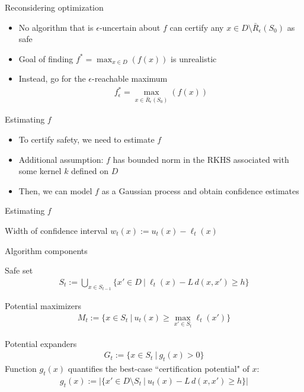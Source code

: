 \documentclass[10pt,mathserif]{beamer}
\newlength\figureheight
\newlength\figurewidth
\newcommand{\Rbeps}{\bar{R}_{\epsilon}}
\newcommand{\bigsmid}{\ \big\vert\ }
\newcommand{\bigsetdef}[2]{\big\{ #1 \bigsmid #2 \big\}}
\begin{document}
\begin{frame}{Reconsidering optimization}
\begin{itemize}
\item No algorithm that is $\epsilon$-uncertain about $f$ can certify any $x \in D \setminus \Rbeps(S_0)$ as safe
\vspace{2em}
\item Goal of finding $f^* = \max_{x \in D}\left(f(x)\right)$ is unrealistic
\vspace{2em}
\item Instead, go for the $\epsilon$-reachable maximum
  \begin{align*}
    f_{\epsilon}^* = \max_{x \in \Rbeps(S_0)}\left(f(x)\right)
  \end{align*}
\end{itemize}
\end{frame}

\begin{frame}{Estimating $f$}
\begin{itemize}
\item To certify safety, we need to estimate $f$
\vspace{2em}
\item Additional assumption: $f$ has bounded norm in the RKHS associated with some kernel $k$ defined on $D$
\vspace{2em}
\item Then, we can model $f$ as a Gaussian process and obtain confidence estimates
\end{itemize}
\end{frame}

\begin{frame}{Estimating $f$}
\centering
\setlength\figurewidth{4.2in}
\setlength\figureheight{2.36in}


Width of confidence interval $w_t(x) := u_t(x) - \ell_t(x)$
\end{frame}

\begin{frame}{Algorithm components}

{\large Safe set}
\begin{align*}
S_t := \bigcup_{x \in S_{t-1}}\bigsetdef{x' \in D}{\ell_t(x) - L\,d(x, x') \geq h}
\end{align*}
\vspace{0.5em}

{\large Potential maximizers}
\begin{align*}
M_t := \bigsetdef{x\in S_t}{u_t(x)\geq \max_{x'\in S_t} \ell_t(x')}
\end{align*}
\vspace{0.5em}

{\large Potential expanders}
\begin{align*}
G_t := \bigsetdef{x\in S_t}{g_t(x)>0}
\end{align*}
Function $g_t(x)$ quantifies the best-case ``certification potential" of $x$:
\begin{align*}
g_t(x) := \Big|\bigsetdef{x' \in D \setminus S_t}{u_t(x) - L\,d(x, x') \geq h}\Big|
\end{align*}
\end{frame}
\end{document}
